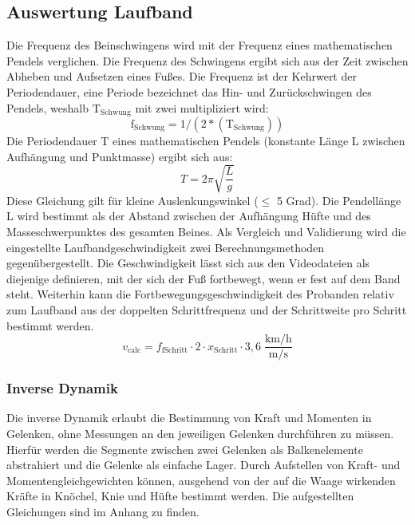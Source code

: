 \subsection{Auswertung Laufband}
Die Frequenz des Beinschwingens wird mit der Frequenz eines mathematischen Pendels verglichen. Die Frequenz des Schwingens ergibt sich aus der Zeit zwischen Abheben und Aufsetzen eines Fußes. Die Frequenz ist der Kehrwert der Periodendauer, eine Periode bezeichnet das Hin- und Zurückschwingen des Pendels, weshalb $\mathrm{T_{Schwung}}$ mit zwei multipliziert wird:
\begin{equation}
\mathrm{f_{Schwung}} = 1 / (2 * (\mathrm{T_{Schwung}}))
\end{equation}
Die Periodendauer T eines mathematischen Pendels (konstante Länge L zwischen Aufhängung und Punktmasse) ergibt sich aus:
\begin{equation}
	T = 2  \pi \sqrt{\frac{L}{g}} 
\end{equation}
Diese Gleichung gilt für kleine Auslenkungswinkel ($\le$ 5 Grad). Die Pendellänge L wird bestimmt als der Abstand zwischen der Aufhängung Hüfte und des Masseschwerpunktes des gesamten Beines.
Als Vergleich und Validierung wird die eingestellte Laufbandgeschwindigkeit zwei Berechnungsmethoden gegenübergestellt. Die Geschwindigkeit lässt sich aus den Videodateien als diejenige definieren, mit der sich der Fuß fortbewegt, wenn er fest auf dem Band steht. Weiterhin kann die Fortbewegungsgeschwindigkeit des Probanden relativ zum Laufband aus der doppelten Schrittfrequenz und der Schrittweite pro Schritt bestimmt werden.
\begin{equation}
v_{\mathrm{calc}} = f_{\mathrm{fSchritt}} \cdot 2 \cdot x_{\mathrm{Schritt}} \cdot 3,6\;\frac{\mathrm{km/h}}{\mathrm{m/s}}
\end{equation}

\subsubsection{Inverse Dynamik}
Die inverse Dynamik erlaubt die Bestimmung von Kraft und Momenten in Gelenken, ohne Messungen an den jeweiligen Gelenken durchführen zu müssen. Hierfür werden die Segmente zwischen zwei Gelenken als Balkenelemente abstrahiert und die Gelenke als einfache Lager. Durch Aufstellen von Kraft- und Momentengleichgewichten können, ausgehend von der auf die Waage wirkenden Kräfte in Knöchel, Knie und Hüfte bestimmt werden. Die aufgestellten Gleichungen sind im Anhang zu finden.

